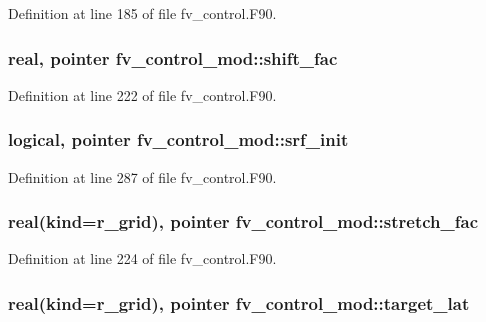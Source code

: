 Definition at line 185 of file fv\-\_\-control.\-F90.

\subsubsection[{shift\-\_\-fac}]{\setlength{\rightskip}{0pt plus 5cm}real, pointer fv\-\_\-control\-\_\-mod\-::shift\-\_\-fac\hspace{0.3cm}{\ttfamily [private]}}\label{classfv__control__mod_a9578e6526f4ae8e6707ba795b3ca8f1f}


Definition at line 222 of file fv\-\_\-control.\-F90.

\subsubsection[{srf\-\_\-init}]{\setlength{\rightskip}{0pt plus 5cm}logical, pointer fv\-\_\-control\-\_\-mod\-::srf\-\_\-init\hspace{0.3cm}{\ttfamily [private]}}\label{classfv__control__mod_a32fd358d603e9d36b2d892f598819878}


Definition at line 287 of file fv\-\_\-control.\-F90.

\subsubsection[{stretch\-\_\-fac}]{\setlength{\rightskip}{0pt plus 5cm}real(kind=r\-\_\-grid), pointer fv\-\_\-control\-\_\-mod\-::stretch\-\_\-fac\hspace{0.3cm}{\ttfamily [private]}}\label{classfv__control__mod_a8bf7e998d37424a5acfd20a1d4345655}


Definition at line 224 of file fv\-\_\-control.\-F90.

\subsubsection[{target\-\_\-lat}]{\setlength{\rightskip}{0pt plus 5cm}real(kind=r\-\_\-grid), pointer fv\-\_\-control\-\_\-mod\-::target\-\_\-lat\hspace{0.3cm}{\ttfamily [private]}}\label{classfv__control__mod_ab6c815af85f5ad4e350b9a70e835863b}


